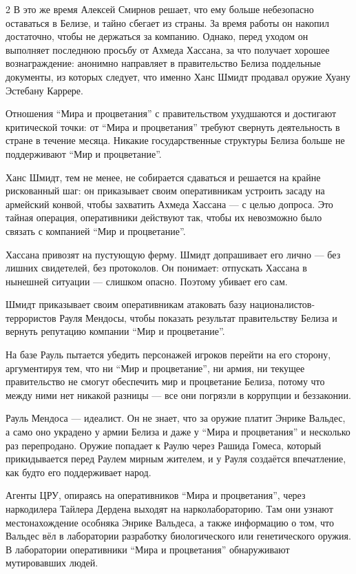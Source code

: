\documentclass[twoside]{article}
\begin{document}
\begin{multicols}{2}
В это же время Алексей Смирнов решает, что ему больше небезопасно
оставаться в Белизе, и тайно сбегает из страны. За время работы он
накопил достаточно, чтобы не держаться за компанию. Однако, перед уходом
он выполняет последнюю просьбу от Ахмеда Хассана, за что получает
хорошее вознаграждение: анонимно направляет в правительство Белиза
поддельные документы, из которых следует, что именно Ханс Шмидт продавал
оружие Хуану Эстебану Каррере.

Отношения \enquote{Мира и процветания} с правительством ухудшаются и достигают
критической точки: от \enquote{Мира и процветания} требуют свернуть деятельность
в стране в течение месяца. Никакие государственные структуры Белиза
больше не поддерживают \enquote{Мир и процветание}.

Ханс Шмидт, тем не менее, не собирается сдаваться и решается на крайне
рискованный шаг: он приказывает своим оперативникам устроить засаду на
армейский конвой, чтобы захватить Ахмеда Хассана --- с целью допроса. Это
тайная операция, оперативники действуют так, чтобы их невозможно было
связать с компанией \enquote{Мир и процветание}.

Хассана привозят на пустующую ферму. Шмидт допрашивает его лично --- без
лишних свидетелей, без протоколов. Он понимает: отпускать Хассана в
нынешней ситуации --- слишком опасно. Поэтому убивает его сам.

Шмидт приказывает своим оперативникам атаковать базу
националистов-террористов Рауля Мендосы, чтобы показать результат
правительству Белиза и вернуть репутацию компании \enquote{Мир и процветание}.

На базе Рауль пытается убедить персонажей игроков перейти на его
сторону, аргументируя тем, что ни \enquote{Мир и процветание}, ни армия, ни
текущее правительство не смогут обеспечить мир и процветание Белиза,
потому что между ними нет никакой разницы --- все они погрязли в
коррупции и беззаконии.

Рауль Мендоса --- идеалист. Он не знает, что за оружие платит Энрике
Вальдес, а само оно украдено у армии Белиза и даже у \enquote{Мира и
процветания} и несколько раз перепродано. Оружие попадает к Раулю через
Рашида Гомеса, который прикидывается перед Раулем мирным жителем, и у
Рауля создаётся впечатление, как будто его поддерживает народ.

Агенты ЦРУ, опираясь на оперативников \enquote{Мира и процветания}, через
наркодилера Тайлера Дердена выходят на нарколабораторию. Там они узнают
местонахождение особняка Энрике Вальдеса, а также информацию о том, что
Вальдес вёл в лаборатории разработку биологического или генетического
оружия. В лаборатории оперативники \enquote{Мира и процветания} обнаруживают
мутировавших людей.


\end{multicols}
\end{document}
